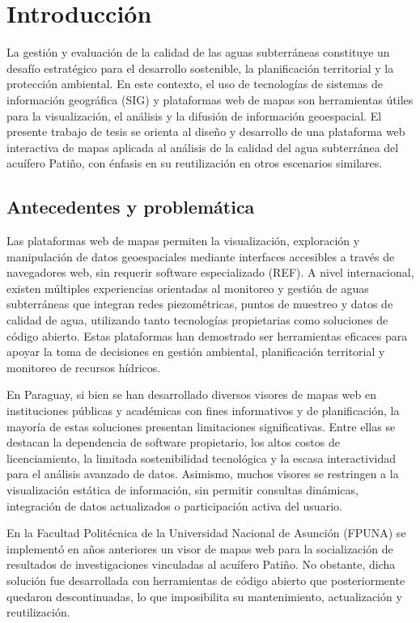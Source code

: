 \documentclass[12pt,a4paper]{report}
\begin{document}
\chapter{Introducción}

La gestión y evaluación de la calidad de las aguas subterráneas constituye un desafío estratégico para el desarrollo sostenible, la planificación territorial y la protección ambiental. En este contexto, el uso de tecnologías de sistemas de información geográfica (SIG) y plataformas web de mapas son herramientas útiles para la visualización, el análisis y la difusión de información geoespacial. El presente trabajo de tesis se orienta al diseño y desarrollo de una plataforma web interactiva de mapas aplicada al análisis de la calidad del agua subterránea del acuífero Patiño, con énfasis en su reutilización en otros escenarios similares.

\section{Antecedentes y problemática}

Las plataformas web de mapas permiten la visualización, exploración y manipulación de datos geoespaciales mediante interfaces accesibles a través de navegadores web, sin requerir software especializado (REF). A nivel internacional, existen múltiples experiencias orientadas al monitoreo y gestión de aguas subterráneas que integran redes piezométricas, puntos de muestreo y datos de calidad de agua, utilizando tanto tecnologías propietarias como soluciones de código abierto. Estas plataformas han demostrado ser herramientas eficaces para apoyar la toma de decisiones en gestión ambiental, planificación territorial y monitoreo de recursos hídricos.

En Paraguay, si bien se han desarrollado diversos visores de mapas web en instituciones públicas y académicas con fines informativos y de planificación, la mayoría de estas soluciones presentan limitaciones significativas. Entre ellas se destacan la dependencia de software propietario, los altos costos de licenciamiento, la limitada sostenibilidad tecnológica y la escasa interactividad para el análisis avanzado de datos. Asimismo, muchos visores se restringen a la visualización estática de información, sin permitir consultas dinámicas, integración de datos actualizados o participación activa del usuario.

En la Facultad Politécnica de la Universidad Nacional de Asunción (FPUNA) se implementó en años anteriores un visor de mapas web para la socialización de resultados de investigaciones vinculadas al acuífero Patiño. No obstante, dicha solución fue desarrollada con herramientas de código abierto que posteriormente quedaron descontinuadas, lo que imposibilita su mantenimiento, actualización y reutilización.
\end{document}
